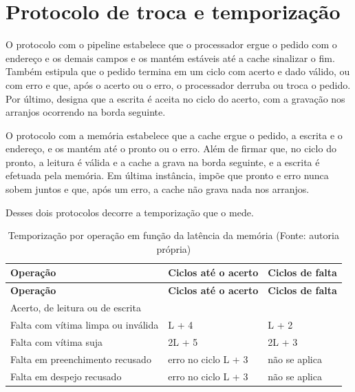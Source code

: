 \section{Protocolo de troca e temporização}\label{sec:3.8}

O protocolo com o pipeline estabelece que o processador ergue o pedido com o endereço e os demais campos e os mantém estáveis até a cache sinalizar o fim. Também estipula que o pedido termina em um ciclo com acerto e dado válido, ou com erro e que, após o acerto ou o erro, o processador derruba ou troca o pedido. Por último, designa que a escrita é aceita no ciclo do acerto, com a gravação nos arranjos ocorrendo na borda seguinte.

O protocolo com a memória estabelece que a cache ergue o pedido, a escrita e o endereço, e os mantém até o pronto ou o erro. Além de firmar que, no ciclo do pronto, a leitura é válida e a cache a grava na borda seguinte, e a escrita é efetuada pela memória. Em última instância, impõe que pronto e erro nunca sobem juntos e que, após um erro, a cache não grava nada nos arranjos.

Desses dois protocolos decorre a temporização que o  mede.

{\small
\begin{longtable}{@{}>{\raggedright\arraybackslash}p{}>{\raggedright\arraybackslash}p{}>{\raggedright\arraybackslash}p{}@{}}
\caption[Temporização por operação em função da latência da memória]{Temporização por operação em função da latência da memória (Fonte: autoria própria)}\label{tab:3.10}\\
\hline
\textbf{Operação} & \textbf{Ciclos até o acerto} & \textbf{Ciclos de falta} \\
\hline
\endfirsthead
\hline
\textbf{Operação} & \textbf{Ciclos até o acerto} & \textbf{Ciclos de falta} \\
\hline
\endhead
\hline
\endlastfoot
Acerto, de leitura ou de escrita & 2 & 0 \\
Falta com vítima limpa ou inválida & L + 4 & L + 2 \\
Falta com vítima suja & 2L + 5 & 2L + 3 \\
Falta em preenchimento recusado & erro no ciclo L + 3 & não se aplica \\
Falta em despejo recusado & erro no ciclo L + 3 & não se aplica \\
\end{longtable}
}

